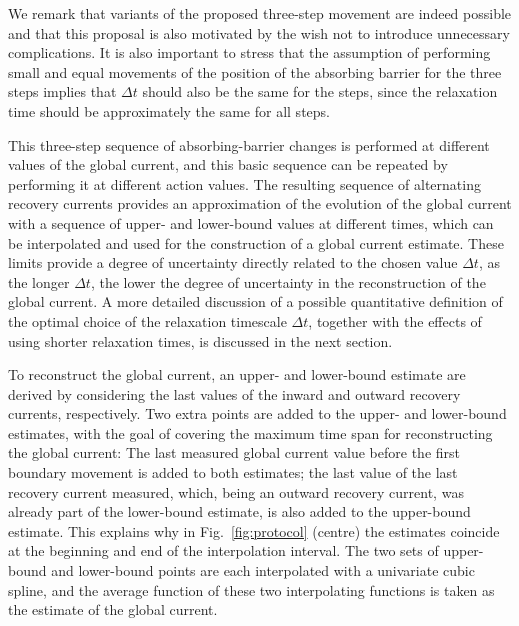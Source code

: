 {We remark that variants of the proposed three-step movement are indeed possible and that this proposal is also motivated by the wish not to introduce unnecessary complications. It is also important to stress that the assumption of performing small and equal movements of the position of the absorbing barrier for the three steps implies that $\Delta t$ should also be the same for the steps, since the relaxation time should be approximately the same for all steps. 

This three-step sequence of absorbing-barrier changes is performed at different values of the global current, and this basic sequence can be repeated by performing it at different action values. The resulting sequence of alternating recovery currents provides an approximation of the evolution of the global current with a sequence of upper- and lower-bound values at different times, which can be interpolated and used for the construction of a global current estimate. These limits provide a degree of uncertainty directly related to the chosen value $\Delta t$, as the longer $\Delta t$, the lower the degree of uncertainty in the reconstruction of the global current. A more detailed discussion of a possible quantitative definition of the optimal choice of the relaxation timescale $\Delta t$, together with the effects of using shorter relaxation times, is discussed in the next section.

To reconstruct the global current, an upper- and lower-bound estimate are derived by considering the last values of the inward and outward recovery currents, respectively. Two extra points are added to the upper- and lower-bound estimates, with the goal of covering the maximum time span for reconstructing the global current: The last measured global current value before the first boundary movement is added to both estimates; the last value of the last recovery current measured, which, being an outward recovery current, was already part of the lower-bound estimate, is also added to the upper-bound estimate. This explains why in Fig.~\ref{fig:protocol} (centre) the estimates coincide at the beginning and end of the interpolation interval. The two sets of upper-bound and lower-bound points are each interpolated with a univariate cubic spline, and the average function of these two interpolating functions is taken as the estimate of the global current. 

}
